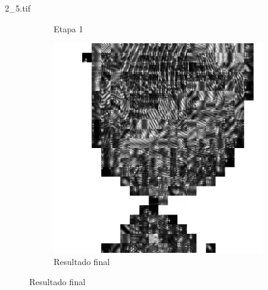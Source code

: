 \documentclass{beamer}
\begin{document}
\begin{frame}{2\_5.tif}
\begin{figure}
\begin{subfigure}[!ht]{0.32\textwidth}
                \caption{Etapa 1}
            \end{subfigure}
            \begin{subfigure}[!ht]{0.32\textwidth}
                \includegraphics[width=\columnwidth]{Fingerprints/2_5_final.jpg}
                \caption{Resultado final}
            \end{subfigure}
        \end{figure}
    \end{frame}
\end{document}
